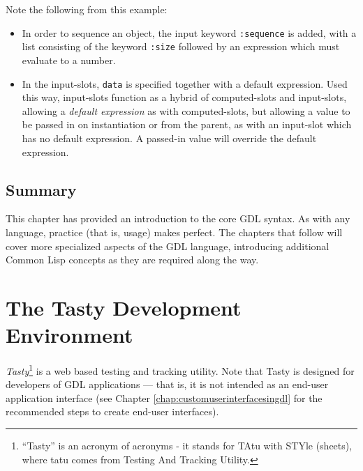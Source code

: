 \documentclass [11pt]{book}
\begin{document}
Note the following from this example:

\begin{itemize}

\item In order to sequence an object, the input keyword \texttt{:sequence} is added, with a list consisting of the keyword \texttt{:size} followed by an expression which must evaluate to a number.

\item In the input-slots, \texttt{data} is specified together with a default expression. Used this way, 
input-slots function as a hybrid of computed-slots and input-slots, allowing a \emph{default expression} as with computed-slots, but allowing a value to be passed in on 
instantiation or from the parent, as with an input-slot which has no default expression. 
A passed-in value will override the default expression.

\end{itemize}



\section{Summary}

\label{sec:summary}

This chapter has provided an introduction to the core GDL
syntax. As with any language, practice (that is, usage) makes
perfect. The chapters that follow will cover more specialized aspects
of the GDL language, introducing additional Common Lisp concepts as
they are required along the way.

\chapter{The Tasty Development Environment}

\label{chap:thetastydevelopmentenvironment}



\emph{Tasty}\footnote{``Tasty'' is an acronym of acronyms - it stands
for TAtu with STYle (sheets), where tatu comes from Testing And
Tracking Utility.} is a web based testing and tracking utility. Note that Tasty is
designed for developers of GDL applications --- that is, it is not intended
as an end-user application interface (see Chapter 
\ref{chap:customuserinterfacesingdl} for the recommended steps to create end-user interfaces).
\end{document}
